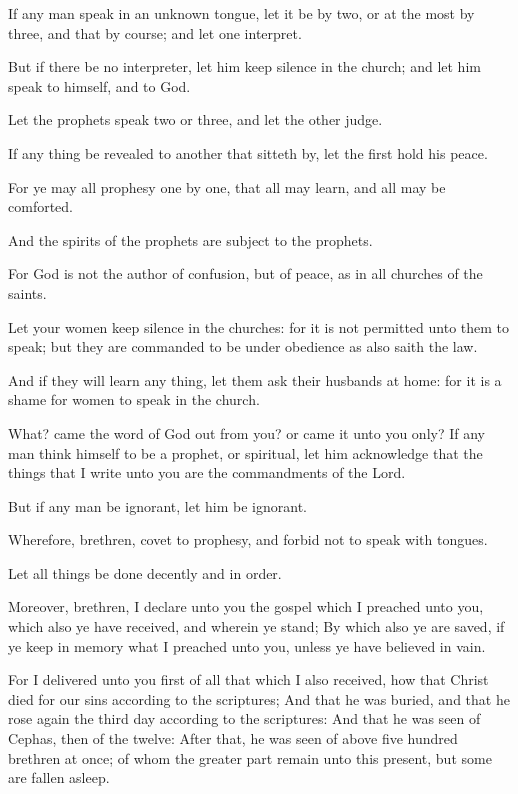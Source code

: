 \Verse If any man speak in an unknown tongue, let it be by two, or at the most by three, and that by course; and let one interpret.

\Verse But if there be no interpreter, let him keep silence in the church; and let him speak to himself, and to God.

\Verse Let the prophets speak two or three, and let the other judge.

\Verse If any thing be revealed to another that sitteth by, let the first hold his peace.

\Verse For ye may all prophesy one by one, that all may learn, and all may be comforted.

\Verse And the spirits of the prophets are subject to the prophets.

\Verse For God is not the author of confusion, but of peace, as in all churches of the saints.

\Verse Let your women keep silence in the churches: for it is not permitted unto them to speak; but they are commanded to be under obedience as also saith the law.

\Verse And if they will learn any thing, let them ask their husbands at home: for it is a shame for women to speak in the church.

\Verse What? came the word of God out from you? or came it unto you only?  \Verse If any man think himself to be a prophet, or spiritual, let him acknowledge that the things that I write unto you are the commandments of the Lord.

\Verse But if any man be ignorant, let him be ignorant.

\Verse Wherefore, brethren, covet to prophesy, and forbid not to speak with tongues.

\Verse Let all things be done decently and in order.


\Chapter
\Verse Moreover, brethren, I declare unto you the gospel which I preached unto you, which also ye have received, and wherein ye stand; \Verse By which also ye are saved, if ye keep in memory what I preached unto you, unless ye have believed in vain.

\Verse For I delivered unto you first of all that which I also received, how that Christ died for our sins according to the scriptures; \Verse And that he was buried, and that he rose again the third day according to the scriptures: \Verse And that he was seen of Cephas, then of the twelve: \Verse After that, he was seen of above five hundred brethren at once; of whom the greater part remain unto this present, but some are fallen asleep.

